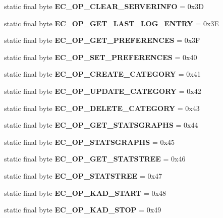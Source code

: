 \begin{DoxyCompactItemize}
\item 
static final byte {\bfseries EC\_\-OP\_\-CLEAR\_\-SERVERINFO} = 0x3D\label{interfaceECCodes_a643f28e831f703fd2e8d619815b98282}

\item 
static final byte {\bfseries EC\_\-OP\_\-GET\_\-LAST\_\-LOG\_\-ENTRY} = 0x3E\label{interfaceECCodes_aead36d587ef814e69e0d778dc7c1afbb}

\item 
static final byte {\bfseries EC\_\-OP\_\-GET\_\-PREFERENCES} = 0x3F\label{interfaceECCodes_ab8676be89c9c7f08dc718aabc5643fe8}

\item 
static final byte {\bfseries EC\_\-OP\_\-SET\_\-PREFERENCES} = 0x40\label{interfaceECCodes_aa0593387c338c30340012c14257277a9}

\item 
static final byte {\bfseries EC\_\-OP\_\-CREATE\_\-CATEGORY} = 0x41\label{interfaceECCodes_ae69a1995b7228638479d8c92417e613b}

\item 
static final byte {\bfseries EC\_\-OP\_\-UPDATE\_\-CATEGORY} = 0x42\label{interfaceECCodes_a15aae80201c6a0318c84f698249e2159}

\item 
static final byte {\bfseries EC\_\-OP\_\-DELETE\_\-CATEGORY} = 0x43\label{interfaceECCodes_acd11a06724e3334038da3f83f166ba9a}

\item 
static final byte {\bfseries EC\_\-OP\_\-GET\_\-STATSGRAPHS} = 0x44\label{interfaceECCodes_a8f9cebbc1a4048b39604b637f8f3dd6c}

\item 
static final byte {\bfseries EC\_\-OP\_\-STATSGRAPHS} = 0x45\label{interfaceECCodes_ac29038c252af86cb01ed9df8dca75a75}

\item 
static final byte {\bfseries EC\_\-OP\_\-GET\_\-STATSTREE} = 0x46\label{interfaceECCodes_a6bc88cadc731cf308f8f6877878db7d2}

\item 
static final byte {\bfseries EC\_\-OP\_\-STATSTREE} = 0x47\label{interfaceECCodes_a0387ece22c22d4e3338d183c4ccb6516}

\item 
static final byte {\bfseries EC\_\-OP\_\-KAD\_\-START} = 0x48\label{interfaceECCodes_a64e8928d4e93dcf6d1ef8d8253175dc8}

\item 
static final byte {\bfseries EC\_\-OP\_\-KAD\_\-STOP} = 0x49\label{interfaceECCodes_a1520a57ace9467a1a2e3b54f0da43372}


\end{DoxyCompactItemize}
